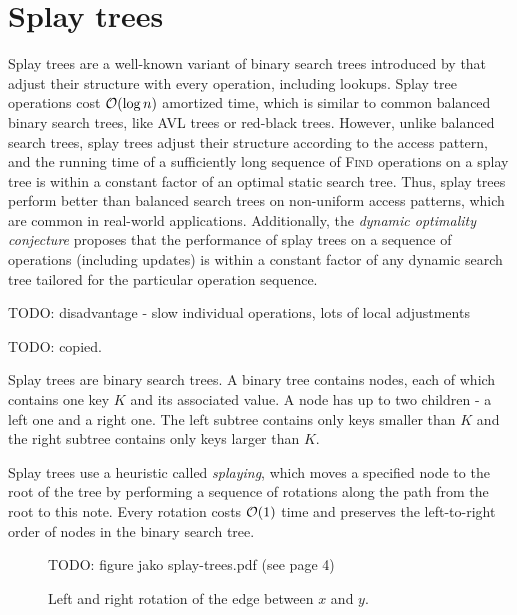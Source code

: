 \chapter{Splay trees}
Splay trees are a well-known variant of binary search trees introduced
by \cite{splay} that adjust their structure with every operation, including
lookups. Splay tree operations cost $\mathcal{O}(\log n)$ amortized time, which is
similar to common balanced binary search trees, like AVL trees or
red-black trees.
However, unlike balanced search trees, splay trees adjust their structure
according to the access pattern, and the running time of a sufficiently long
sequence of \textsc{Find} operations on a splay tree is within a constant
factor of an optimal static search tree.
Thus, splay trees perform better than balanced search trees on non-uniform
access patterns, which are common in real-world applications.
Additionally, the \textit{dynamic optimality conjecture} proposes that
the performance of splay trees on a sequence of operations (including updates)
is within a constant factor of any dynamic search tree tailored for
the particular operation sequence.

TODO: disadvantage - slow individual operations, lots of local adjustments

TODO: copied.

Splay trees are binary search trees. A binary tree contains nodes, each of which
contains one key $K$ and its associated value.
A node has up to two children - a left one and a right one.
The left subtree contains only keys smaller than $K$ and the right subtree
contains only keys larger than $K$.


Splay trees use a heuristic called \textit{splaying}, which moves a specified
node to the root of the tree by performing a sequence of rotations along the
path from the root to this note. Every rotation costs $\mathcal{O}(1)$ time and preserves
the left-to-right order of nodes in the binary search tree.

\begin{figure}
\centering
TODO: figure jako splay-trees.pdf (see page 4)
\caption{Left and right rotation of the edge between $x$ and $y$.}
\end{figure}

